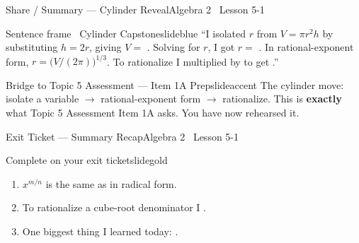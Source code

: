 \documentclass[aspectratio=169, 11pt]{beamer}
\begin{document}
\begin{frame}[shrink=8]{Share / Summary --- Cylinder Reveal}{Algebra 2 \textperiodcentered\ Lesson 5-1}
\vspace{0.2cm}
\begin{projcard}{Sentence frame \textperiodcentered\ Cylinder Capstone}{slideblue}
\small
``I isolated \(r\) from \(V = \pi r^2 h\) by substituting \(h = 2r\), giving
\(V =\) \underline{\hspace{1.6cm}}.
Solving for \(r\), I got \(r =\) \underline{\hspace{1.6cm}}.
In rational-exponent form, \(r = \bigl(V/(2\pi)\bigr)^{1/3}\).
To rationalize I multiplied by \underline{\hspace{1cm}} to get \underline{\hspace{1.6cm}}.''
\end{projcard}

\vspace{0.15cm}
\begin{projcard}{Bridge to Topic 5 Assessment --- Item 1A Prep}{slideaccent}
\small
The cylinder move: isolate a variable \(\rightarrow\) rational-exponent form \(\rightarrow\) rationalize.
This is \textbf{exactly} what Topic 5 Assessment Item 1A asks. You have now rehearsed it.
\end{projcard}
\end{frame}

\begin{frame}{Exit Ticket --- Summary Recap}{Algebra 2 \textperiodcentered\ Lesson 5-1}
\vspace{0.2cm}
\begin{projcard}{Complete on your exit ticket}{slidegold}
\begin{enumerate}
  \setlength{\itemsep}{0.25cm}
  \item \(x^{m/n}\) is the same as \underline{\hspace{5cm}} in radical form.
  \item To rationalize a cube-root denominator I \underline{\hspace{4.2cm}}.
  \item One biggest thing I learned today: \underline{\hspace{4cm}}.
\end{enumerate}
\end{projcard}
\end{frame}
\end{document}
